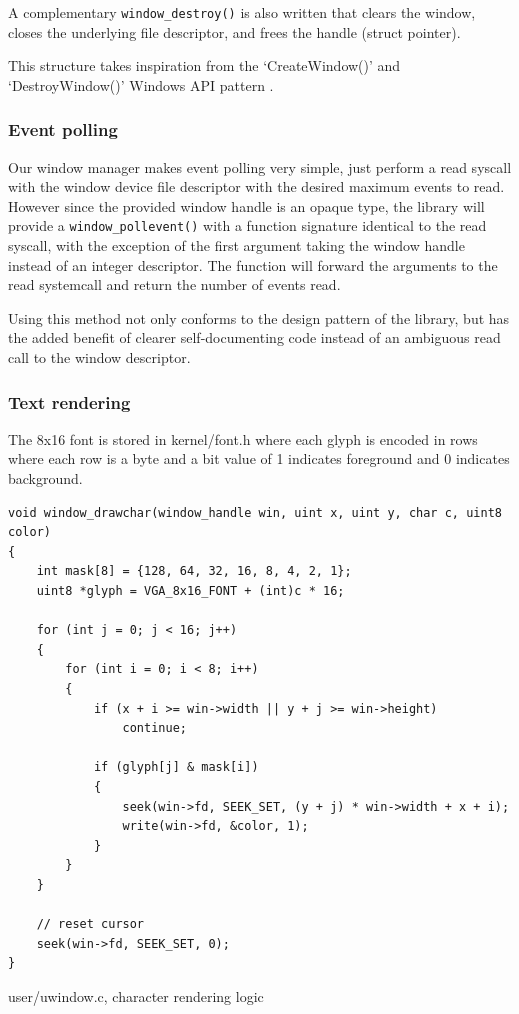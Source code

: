 A complementary \texttt{window_destroy()} is also written that clears
the window, closes the underlying file descriptor, and frees the handle (struct pointer).

This structure takes inspiration from the `CreateWindow()' and `DestroyWindow()' 
Windows API pattern \cite{windowsapi:window}.

\subsubsection{Event polling}
Our window manager makes event polling very simple, just perform a read syscall
with the window device file descriptor with the desired maximum events to read.
However since the provided window handle is an opaque type, the library will provide
a \texttt{window_pollevent()} with a function signature identical to the read syscall,
with the exception of the first argument taking the window handle instead of an integer 
descriptor. The function will forward the arguments to the read systemcall and return
the number of events read. 

Using this method not only conforms to the design pattern of the library, but
has the added benefit of clearer self-documenting code instead of an ambiguous
read call to the window descriptor.

\subsubsection{Text rendering}
The 8x16 font is stored in kernel/font.h where each glyph is encoded in rows where 
each row is a byte and a bit value of 1 indicates foreground and 0 indicates background.

\begin{listing}[h]
    \begin{verbatim}
void window_drawchar(window_handle win, uint x, uint y, char c, uint8 color)
{
    int mask[8] = {128, 64, 32, 16, 8, 4, 2, 1};
    uint8 *glyph = VGA_8x16_FONT + (int)c * 16;

    for (int j = 0; j < 16; j++)
    {
        for (int i = 0; i < 8; i++)
        {
            if (x + i >= win->width || y + j >= win->height)
                continue;
            
            if (glyph[j] & mask[i])
            {
                seek(win->fd, SEEK_SET, (y + j) * win->width + x + i);
                write(win->fd, &color, 1);
            }
        }
    }

    // reset cursor
    seek(win->fd, SEEK_SET, 0);
}
    \end{verbatim}
    \caption{user/uwindow.c, character rendering logic}
    \label{listing:charrender}
\end{listing}

